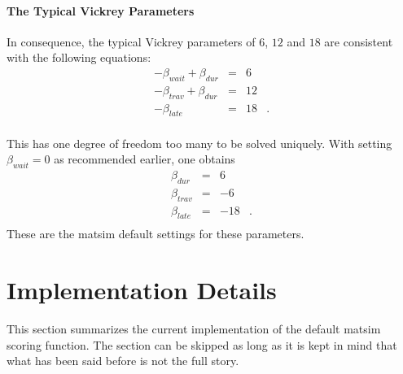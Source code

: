 \paragraph{The Typical Vickrey Parameters}

In consequence, the typical Vickrey parameters of $6$, $12$ and $18$   are consistent with the following equations:
\begin{equation}
\begin{array}{ccrc}
-\beta_{wait} + \beta_{dur} & = & 6 & \\
-\beta_{trav} + \beta_{dur} & = & 12 & \\
- \beta_{late} & = & 18 & . \\
\end{array}
\end{equation}

This has one degree of freedom too many to be solved uniquely.  With setting $\beta_{wait} = 0$ as recommended earlier, one obtains
\begin{equation}
  \begin{array}{lcrc}
    \beta_{dur} & = & 6 & \\
\beta_{trav} & = & - 6 & \\
\beta_{late} & = & - 18 & .\\
  \end{array}
  \label{eq:derivation-of-scoring-default}
\end{equation}
These are the \gls{matsim} default settings for these parameters.

\section{Implementation Details}
\label{sec:scoring-current}
This section summarizes the current implementation of the default \gls{matsim} scoring function. The section can be skipped as long as it is kept in mind that what has been said before is not the full story.

%

